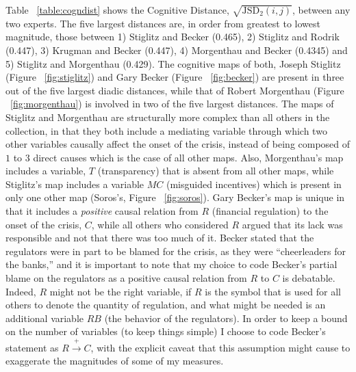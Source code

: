 \documentclass[12pt]{article}
\begin{document}
Table ~\ref{table:cogndist} shows the Cognitive Distance, $\sqrt{\text{JSD}_2(i, j)}$, between any two experts. The five largest distances are, in order from greatest to lowest magnitude, those between 1) Stiglitz and Becker (0.465), 2) Stiglitz and Rodrik (0.447), 3) Krugman and Becker (0.447), 4) Morgenthau and Becker (0.4345) and 5) Stiglitz and Morgenthau (0.429). The cognitive maps of both, Joseph Stiglitz (Figure ~\ref{fig:stiglitz}) and Gary Becker (Figure ~\ref{fig:becker}) are present in three out of the five largest diadic distances, while that of Robert Morgenthau (Figure ~\ref{fig:morgenthau}) is involved in two of the five largest distances. The maps of Stiglitz and Morgenthau are structurally more complex than all others in the collection, in that they both include a mediating variable through which two other variables causally affect the onset of the crisis, instead of being composed of $1$ to $3$ direct causes which is the case of all other maps. Also, Morgenthau's map includes a variable, $T$ (transparency) that is absent from all other maps, while Stiglitz's map includes a variable $MC$ (misguided incentives) which is present in only one other map (Soros's, Figure ~\ref{fig:soros}). Gary Becker's map is unique in that it includes a \textit{positive} causal relation from $R$ (financial regulation) to the onset of the crisis, $C$, while all others who considered $R$ argued that its lack was responsible and not that there was too much of it. Becker stated that the regulators were in part to be blamed for the crisis, as they were ``cheerleaders for the banks,'' and it is important to note that my choice to code Becker's partial blame on the regulators as a positive causal relation from $R$ to $C$ is debatable. Indeed, $R$ might not be the right variable, if $R$ is the symbol that is used for all others to denote the quantity of regulation, and what might be needed is an additional variable $RB$ (the behavior of the regulators). In order to keep a bound on the number of variables (to keep things simple) I choose to code Becker's statement as $R \xrightarrow{+} C$, with the explicit caveat that this assumption might cause to exaggerate the magnitudes of some of my measures.
\end{document}
